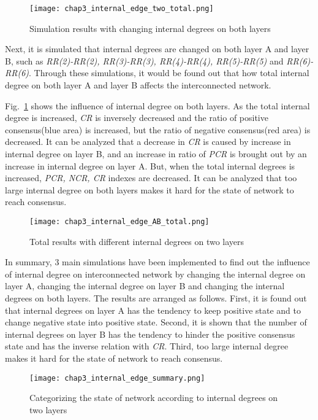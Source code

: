 \begin{figure}[!htb]
	\centering
	\texttt{[image: chap3\_internal\_edge\_two\_total.png]}
	\caption{Simulation results with changing internal degrees on both layers}
	\label{chap3_internal_edge_two_total}
\end{figure}

Next, it is simulated that internal degrees are changed on both layer A and layer B, such as \textit{RR(2)-RR(2), RR(3)-RR(3), RR(4)-RR(4), RR(5)-RR(5)} and \textit{RR(6)-RR(6)}. Through these simulations, it would be found out that how total internal degree on both layer A and layer B affects the interconnected network.

Fig.~\ref{chap3_internal_edge_two_total} shows the influence of internal degree on both layers. As the total internal degree is increased, \textit{CR} is inversely decreased and the ratio of positive consensus(blue area) is increased, but the ratio of negative consensus(red area) is decreased. It can be analyzed that a decrease in \textit{CR} is caused by increase in internal degree on layer B, and an increase in ratio of \textit{PCR} is brought out by an increase in internal degree on layer A. But, when the total internal degrees is increased, \textit{PCR, NCR, CR} indexes are decreased. It can be analyzed that too large internal degree on both layers makes it hard for the state of network to reach consensus. 
\begin{figure}[!htb]
	\centering
	\texttt{[image: chap3\_internal\_edge\_AB\_total.png]}
	\caption{Total results with different internal degrees on two layers}
	\label{chap3_internal_edge_AB_total}
\end{figure}

In summary, $3$ main simulations have been implemented to find out the influence of internal degree on interconnected network by changing the internal degree on layer A, changing the internal degree on layer B and changing the internal degrees on both layers. The results are arranged as follows. First, it is found out that internal degrees on layer A has the tendency to keep positive state and to change negative state into positive state. Second,  it is shown that the number of internal degrees on layer B has the tendency to hinder the positive consensus state and has the inverse relation with \textit{CR}. Third, too large internal degree makes it hard for the state of network to reach consensus. 

\begin{figure}[!htb]
	\centering
	\texttt{[image: chap3\_internal\_edge\_summary.png]}
	\caption{Categorizing the state of network according to internal degrees on two layers}
	\label{chap3_internal_edge_summary}
\end{figure}

